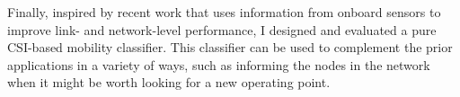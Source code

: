 Finally, inspired by recent work that uses information from onboard sensors to improve link- and network-level performance, I designed and evaluated a pure CSI-based mobility classifier. This classifier can be used to complement the prior applications in a variety of ways, such as informing the nodes in the network when it might be worth looking for a new operating point.


\ifx\mainfile\undefined

\fi